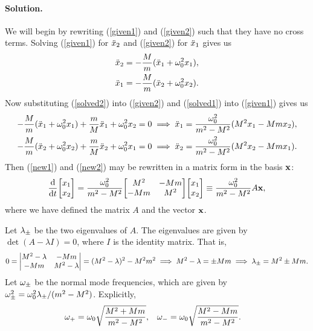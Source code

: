 \documentclass[11pt]{article}
\newcommand{\refeq}[1]{(\ref{#1})}
\newenvironment{solution}
{
    \paragraph{Solution.}
    \ignorespaces
}
{
    \bigskip
}
\begin{document}
\begin{solution}
	We will begin by rewriting \refeq{given1} and \refeq{given2} such that they have no cross terms.  Solving \refeq{given1} for $\ddot{x}_2$ and \refeq{given2} for $\ddot{x}_1$ gives us
	\begin{align}
		\ddot{x}_2 &= -\frac{M}{m} (\ddot{x}_1 + \omega_0^2 x_1), \label{solved2} \\
		\ddot{x}_1 &= -\frac{M}{m} (\ddot{x}_2 + \omega_0^2 x_2). \label{solved1}
	\end{align}
	Now substituting \refeq{solved2} into \refeq{given2} and \refeq{solved1} into \refeq{given1} gives us
	\begin{align}
		-\frac{M}{m} (\ddot{x}_1 + \omega_0^2 x_1) + \frac{m}{M} \ddot{x}_1 + \omega_0^2 x_2 = 0 &\implies \ddot{x}_1 = \frac{\omega_0^2}{m^2 - M^2} (M^2 x_1 - M m x_2), \label{new1} \\
		-\frac{M}{m} (\ddot{x}_2 + \omega_0^2 x_2) + \frac{m}{M} \ddot{x}_2 + \omega_0^2 x_1 = 0 &\implies \ddot{x}_2 = \frac{\omega_0^2}{m^2 - M^2} (M^2 x_2 - M m x_1). \label{new2}
	\end{align}
	Then \refeq{new1} and \refeq{new2} may be rewritten in a matrix form in the basis $\mathbf{x}$:
	\begin{align}
		\dv{}{t} \mqty[ \xq \\ \xw ] = \frac{\omo^2}{m^2 - M^2} \mqty[ M^2 & -Mm \\ -Mm & M^2 ] \mqty[ \xq \\ \xw ] \equiv \frac{\omo^2}{m^2 - M^2} A \vx,
	\end{align}
	where we have defined the matrix $A$ and the vector $\mathbf{x}$.
	
	Let $\lambda_\pm$ be the two eigenvalues of $A$.  The eigenvalues are given by $\det(A - \lambda I) = 0$, where $I$ is the identity matrix.  That is,
	\begin{align}
		0 = \mdet{M^2 - \lambda & -Mm \\ -Mm & M^2 - \lambda} = (M^2 - \lambda)^2 - M^2 m^2 \implies M^2 - \lambda = \pm Mm \implies \lmpm = M^2 \pm Mm.
	\end{align}
	Let $\omega_\pm$ be the normal mode frequencies, which are given by $\omega_\pm^2 = \omega_0^2 \lambda_\pm / (m^2 - M^2)$.  Explicitly,
	\begin{align}
		\omega_+ &= \omega_0 \sqrt{\frac{M^2 + Mm}{m^2 - M^2}}, &
		\omega_- &= \omega_0 \sqrt{\frac{M^2 - Mm}{m^2 - M^2}}.
	\end{align}
\end{solution}

\newcommand{\mq}{m_1}
\newcommand{\mw}{m_2}
\newcommand{\elq}{\ell_1}
\newcommand{\elw}{\ell_2}
\end{document}
